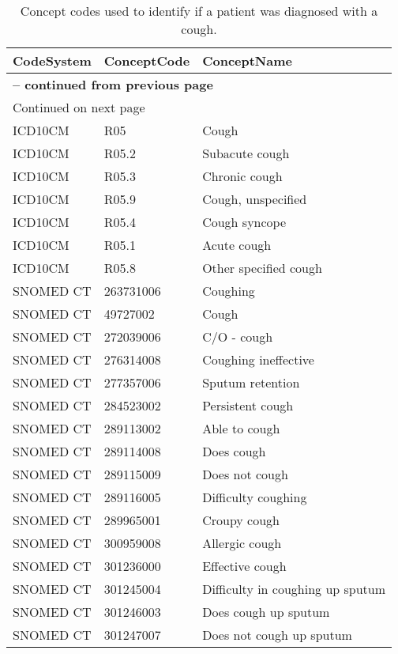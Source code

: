 \begin{longtable}{p{}p{}p{}}
\caption{Concept codes used to identify if a patient was diagnosed with a cough.} \\ 
 CodeSystem & ConceptCode & ConceptName \\ 
  \hline 
\endfirsthead 
\multicolumn{3}{p{\textwidth}}{{ \bfseries \tablename \thetable{} -- continued from previous page}} \ 
\hline CodeSystem & ConceptCode & ConceptName \\ \hline 
\endhead 
\hline \multicolumn{3}{p{\textwidth}}{{Continued on next page}} \\ \hline 
\endfoot 
\hline 
\endlastfoot 
 \hline
ICD10CM & R05 & Cough \\ 
  ICD10CM & R05.2 & Subacute cough \\ 
  ICD10CM & R05.3 & Chronic cough \\ 
  ICD10CM & R05.9 & Cough, unspecified \\ 
  ICD10CM & R05.4 & Cough syncope \\ 
  ICD10CM & R05.1 & Acute cough \\ 
  ICD10CM & R05.8 & Other specified cough \\ 
  SNOMED CT & 263731006 & Coughing \\ 
  SNOMED CT & 49727002 & Cough \\ 
  SNOMED CT & 272039006 & C/O - cough \\ 
  SNOMED CT & 276314008 & Coughing ineffective \\ 
  SNOMED CT & 277357006 & Sputum retention \\ 
  SNOMED CT & 284523002 & Persistent cough \\ 
  SNOMED CT & 289113002 & Able to cough \\ 
  SNOMED CT & 289114008 & Does cough \\ 
  SNOMED CT & 289115009 & Does not cough \\ 
  SNOMED CT & 289116005 & Difficulty coughing \\ 
  SNOMED CT & 289965001 & Croupy cough \\ 
  SNOMED CT & 300959008 & Allergic cough \\ 
  SNOMED CT & 301236000 & Effective cough \\ 
  SNOMED CT & 301245004 & Difficulty in coughing up sputum \\ 
  SNOMED CT & 301246003 & Does cough up sputum \\ 
  SNOMED CT & 301247007 & Does not cough up sputum \\ 

\end{longtable}
